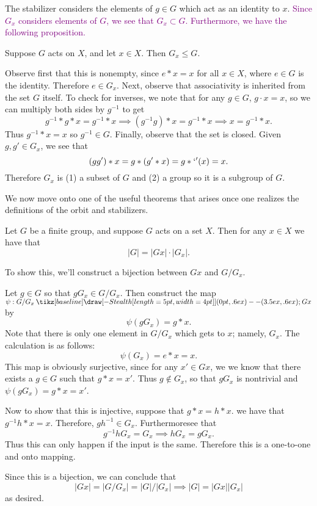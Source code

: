 \documentclass[12pt,letterpaper]{algebra_book}
\renewcommand{\to}{\mathbin{\tikz[baseline] \draw[-{Stealth[length=5pt,width=4pt]}] (0pt,.6ex) -- (3.5ex,.6ex);}}
\theoremstyle{definition}
\begin{document}
    The stabilizer considers the elements of $g \in G$ which act as an
    identity to $x$. \textcolor{purple}{Since $G_x$ considers elements
    of $G$, we see that $G_x \subset G$. Furthermore, we have the
    following proposition.}

    \begin{proposition}
        Suppose $G$ acts on $X$, and let $x \in X$. Then $G_x \le G$.
    \end{proposition}

    \begin{prf}
        Observe first that this is nonempty, since $e * x = x$ for
        all $x \in X$, where $e \in G$ is the identity. Therefore $e
        \in G_x$. Next, observe that associativity is inherited from
        the set $G$ itself. To check for inverses, we note that for any $g \in G$, $g \cdot x = x$, 
        so we can multiply both sides by $g^{-1}$ to get
        \[  
            g^{-1} * g * x = g^{-1} * x \implies (g^{-1}g) * x = g^{-1} * x 
            \implies x = g^{-1} * x.
        \]
        Thus $g^{-1} * x = x$ so $g^{-1} \in G$. Finally, observe
        that the set is closed. Given $g, g' \in G_x$, we see that 
        \[
            (gg') * x = g * (g' * x) = g *`' (x) = x.
        \]
        Therefore $G_x$ is (1) a subset of $G$ and (2) a group so it
        is a subgroup of $G$.

    \end{prf}
    We now move onto one of the useful theorems that arises once one
    realizes the definitions of the orbit and stabilizers.

    \begin{thm}
        Let $G$ be a finite group, and suppose $G$ acts on a set $X$.
        Then for any $x \in X$ we have that 
        \[
            |G| = |Gx| \cdot |G_x|.
        \]
    \end{thm}

    \begin{prf}
        To show this, we'll construct a bijection between $Gx$ and
        $G/G_x$. 

        Let $g \in G$ so that $gG_x \in G/G_x$. Then construct the map
        $\psi: G/G_x \to Gx$ by
        \[
            \psi(gG_x) = g * x.
        \]
        Note that there is only one element in $G/G_x$ which gets
       to $x$; namely, $G_x$. The calculation is as follows:
       \[
            \psi(G_x) = e * x = x.
       \]
       This map is obviously surjective, since for any $x' \in Gx$, we
        we know that there exists a $g \in G$ such that $g * x = x'$.
        Thus $g \not\in G_x$, so that $gG_x$ is nontrivial and
        $\psi(gG_x) = g * x = x'$.

        Now to show that this is injective, suppose that $g*x = h*x$.
     we have that $g^{-1}h * x = x$. Therefore, $gh^{-1} \in G_x$.
     Furthermoresee that 
     \[
         g^{-1}hG_x = G_x \implies hG_x = gG_x.
     \]
     Thus this can only happen if the input is the same. Therefore
     this is a one-to-one and onto mapping. 

     Since this is a bijection, we can conclude that 
     \[
        |Gx| = |G/G_x| = |G|/|G_x| \implies |G| = |Gx||G_x|    
     \]
     as desired.
    \end{prf}
    
\end{document}
